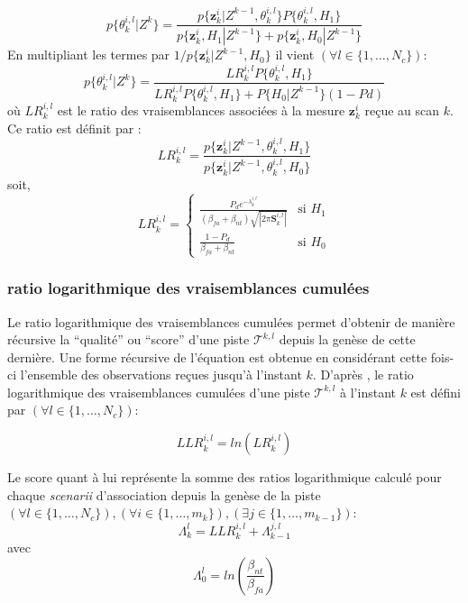 \documentclass[10pt,french,a4paper]{report}
\begin{document}
 \begin{equation}
  p\{\theta^{i,l}_k|Z^{k}\}= \frac{p\{\mathbf{z}_k^i| Z^{k-1},\theta^{i,l}_k \}P\{\theta^{i,l}_k,H_1\}}{p \{\mathbf{z}_k^i,H_1 |Z^{k-1} \} + p\{\mathbf{z}_k^i,H_0 |Z^{k-1} \}}
 	  \end{equation}
 	  En multipliant les termes par $ 1/  p\{\mathbf{z}_k^i |Z^{k-1},H_0 \}$ il vient $(\forall l \in \{1,\ldots,N_c\})$:   
 	   \begin{equation}
  p\{\theta^{i,l}_k|Z^{k}\}= \frac{  LR_k^{i,l} P\{\theta^{i,l}_k,H_1\}}{LR_k^{i,l} P\{\theta^{i,l}_k,H_1\} +  P\{H_0 |Z^{k-1} \}(1-Pd)}
 	  \end{equation}
 	  où $LR_k^{i,l}$ est le ratio des vraisemblances associées à la mesure $\mathbf{z}_k^i$ reçue au scan $k$. Ce ratio est définit par :
  	   \begin{equation}
 LR_k^{i,l}= \frac{ p\{\mathbf{z}_k^i| Z^{k-1},\theta^{i,l}_k , H_1\} }{ p\{\mathbf{z}_k^i| Z^{k-1},\theta^{i,l}_k ,H_0\}}
 	  \end{equation}	  
 	  soit, 
 	 	   \begin{equation}  
 	   LR_k^{i,l}=
 	   	   \begin{cases}
  \frac{ P_d e^{-\lambda_k^{i,l}}}{(\beta_{fa}+\beta_{nt})\sqrt{|2\pi\mathbf{S}_k^{i,l}|}} & \text{si $H_1$} \\ 
  \frac{1-P_d}{\beta_{fa}+\beta_{nt}} & \text{si $H_0$}
 	  \end{cases} 
 	    \end{equation}
 	    
			 \subsubsection{ratio logarithmique des vraisemblances cumulées}
			 Le ratio logarithmique des vraisemblances cumulées permet d'obtenir de manière récursive la ``qualité'' ou ``score'' d'une piste $\mathcal{T}^{k,l}$ depuis la genèse de cette dernière. Une forme récursive de l'équation est obtenue en considérant cette fois-ci l'ensemble des observations reçues jusqu'à l'instant $k$. 
D'après \cite{Blackman1999}, le ratio logarithmique des vraisemblances cumulées d'une piste  $\mathcal{T}^{k,l}$ à l'instant $k$ est défini par $(\forall l \in \{1,\ldots,N_c\})$: 

  \begin{equation}  
 	   LLR_k^{i,l}= ln(LR_k^{i,l})
 	\end{equation}
	
Le score quant à lui représente la somme des ratios logarithmique calculé  pour chaque \textit{scenarii} d'association depuis la genèse de la piste   
$(\forall l \in \{1,\ldots,N_c\}),(\forall i \in \{1,\ldots,m_k\}),(\exists j \in \{1,\ldots,m_{k-1}\})$:
  \begin{equation}  
 	   \Lambda_k^{l}=  LLR_k^{i,l} + \Lambda_{k-1}^{j,l}
 	\end{equation}
 	avec 
 	  \begin{equation}  
 	   \Lambda_0^{l}=ln(\frac{\beta_{nt}}{\beta_{fa}} ) 
 	\end{equation}	 
			 
\end{document}
